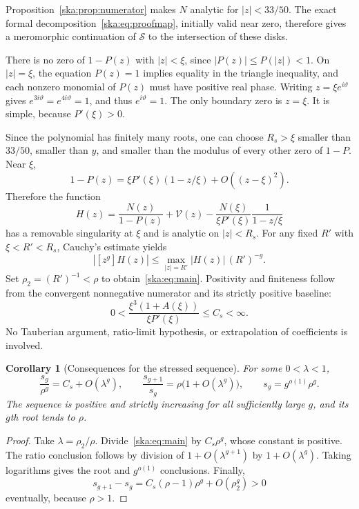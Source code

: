 \documentclass[11pt,letterpaper]{article}
\newtheorem{corollary}[theorem]{Corollary}
\theoremstyle{definition}
\newcommand{\cS}{\mathcal S}\newcommand{\cU}{\mathcal U}
\newcommand{\cV}{\mathcal V}\newcommand{\cT}{\mathcal T}
\begin{document}
Proposition~\ref{ska:prop:numerator} makes $N$ analytic for $|z|<33/50$. The exact formal decomposition~\eqref{ska:eq:proofmap}, initially valid near zero, therefore gives a meromorphic continuation of $\cS$ to the intersection of these disks.

There is no zero of $1-P(z)$ with $|z|<\xi$, since $|P(z)|\le P(|z|)<1$. On $|z|=\xi$, the equation $P(z)=1$ implies equality in the triangle inequality, and each nonzero monomial of $P(z)$ must have positive real phase. Writing $z=\xi e^{i\vartheta}$ gives $e^{3i\vartheta}=e^{4i\vartheta}=1$, and thus $e^{i\vartheta}=1$. The only boundary zero is $z=\xi$. It is simple, because $P'(\xi)>0$.

Since the polynomial has finitely many roots, one can choose $R_s>\xi$ smaller than $33/50$, smaller than $y$, and smaller than the modulus of every other zero of $1-P$. Near $\xi$,
\[
1-P(z)=\xi P'(\xi)(1-z/\xi)+O((z-\xi)^2).
\]
Therefore the function
\begin{equation}\label{ska:eq:analyticremainder}
H(z)=\frac{N(z)}{1-P(z)}+\cV(z)
-\frac{N(\xi)}{\xi P'(\xi)}\frac1{1-z/\xi}
\end{equation}
has a removable singularity at $\xi$ and is analytic on $|z|<R_s$. For any fixed $R'$ with $\xi<R'<R_s$, Cauchy's estimate yields
\[
|[z^g]H(z)|\le \max_{|z|=R'}|H(z)|\,(R')^{-g}.
\]
Set $\rho_2=(R')^{-1}<\rho$ to obtain~\eqref{ska:eq:main}. Positivity and finiteness follow from the convergent nonnegative numerator and its strictly positive baseline:
\begin{equation}\label{ska:eq:positivity}
0<\frac{\xi^3(1+A(\xi))}{\xi P'(\xi)}\le C_s<\infty.
\end{equation}
No Tauberian argument, ratio-limit hypothesis, or extrapolation of coefficients is involved.

\begin{corollary}[Consequences for the stressed sequence]\label{ska:cor:stress}
For some $0<\lambda<1$,
\begin{equation}\label{ska:eq:stressconsequences}
\frac{s_g}{\rho^g}=C_s+O(\lambda^g),\qquad
\frac{s_{g+1}}{s_g}=\rho\bigl(1+O(\lambda^g)\bigr),\qquad
s_g=g^{o(1)}\rho^g.
\end{equation}
The sequence is positive and strictly increasing for all sufficiently large $g$, and its $g$th root tends to $\rho$.
\end{corollary}
\begin{proof}
Take $\lambda=\rho_2/\rho$. Divide~\eqref{ska:eq:main} by $C_s\rho^g$, whose constant is positive. The ratio conclusion follows by division of $1+O(\lambda^{g+1})$ by $1+O(\lambda^g)$. Taking logarithms gives the root and $g^{o(1)}$ conclusions. Finally,
\[
s_{g+1}-s_g=C_s(\rho-1)\rho^g+O(\rho_2^g)>0
\]
eventually, because $\rho>1$.
\end{proof}
\end{document}
